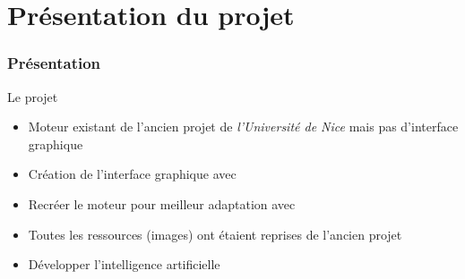 \section{Présentation du projet}
	\begin{frame}
		\frametitle{Présentation}
		\begin{block}{Le projet}
			\begin{itemize}
				\item Moteur existant de l'ancien projet de \emph{l'Université de Nice} mais pas d'interface graphique
				\item Création de l'interface graphique avec \fx
				\item Recréer le moteur pour meilleur adaptation avec \fx
				\item Toutes les ressources (images) ont étaient reprises de l'ancien projet
				\item Développer l'intelligence artificielle
			\end{itemize}
		\end{block}	
\end{frame}